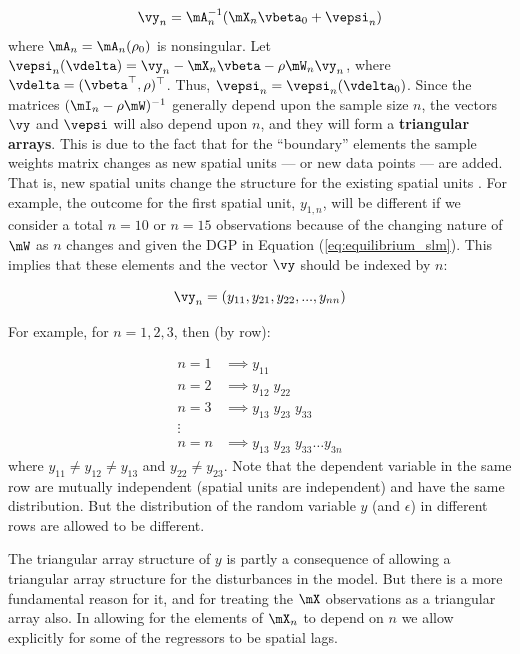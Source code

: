 \documentclass[english,12pt]{book}\usepackage[]{graphicx}\usepackage[]{xcolor}
\begin{document}
\begin{equation}\label{eq:equilibrium_slm}
\vy_n = \mA_n^{-1}(\mX_n\vbeta_0 + \vepsi_n)
\end{equation}
%
where $\mA_n = \mA_n(\rho_0)$ is nonsingular. Let $\vepsi_n(\vdelta) = \vy_n - \mX_n\vbeta - \rho \mW_n\vy_n$, where $\vdelta = (\vbeta^\top, \rho)^\top$. Thus, $\vepsi_n = \vepsi_n(\vdelta_0)$. Since the matrices $(\mI_n - \rho\mW)^{-1}$ generally depend upon the sample size $n$, the vectors $\vy$ and $\vepsi$ will also depend upon $n$, and they will form a \textbf{triangular arrays}. This is due to the fact that for the ``boundary'' elements the sample weights matrix changes as new spatial units --- or new data points --- are added. That is, new spatial units change the structure for the existing spatial units \citep[see for example][]{kelejian1999generalized, kelejian2001asymptotic, anselinSpatialEcon}. For example, the outcome for the first spatial unit, $y_{1,n}$, will be different if we consider a total  $n = 10$ or $n = 15$ observations because of the changing nature of $\mW$ as $n$ changes and given the DGP in Equation (\ref{eq:equilibrium_slm}). This implies that these elements and the vector $\vy$ should be indexed by $n$:

\begin{equation*}
  \vy_n = (y_{11}, y_{21}, y_{22},..., y_{nn})
\end{equation*}

For example, for $n = 1, 2, 3$, then (by row):

\begin{equation*}
\begin{aligned}
  n = 1 & \implies y_{11} \;         \\
  n = 2 & \implies y_{12} \; y_{22}  \\
  n = 3 & \implies y_{13} \; y_{23} \; y_{33} \\
  \vdots & \\
  n = n & \implies y_{13} \; y_{23} \; y_{33} \hdots y_{3n}
\end{aligned}
\end{equation*}
%
where $y_{11} \neq y_{12} \neq y_{13}$ and $y_{22}\neq y_{23}$. Note that the dependent variable in the same row are mutually independent (spatial units are independent) and have the same distribution. But the distribution of  the random variable $y$ (and $\epsilon$) in different rows are allowed to be different. 

The triangular array structure of $y$ is partly a consequence of allowing a triangular array structure for the disturbances in the model. But there is a more fundamental reason for it, and for treating the $\mX$ observations as a triangular array also. In allowing for the elements of $\mX_n$ to depend on $n$ we allow explicitly for some of the regressors to be spatial lags.
\end{document}
